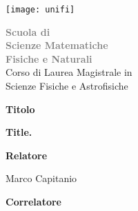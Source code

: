 \newenvironment{helv}{\fontfamily{qhv}\selectfont}{\par}

\begin{titlepage}
\begin{helv}
    \begin{center}
        \begin{minipage}{0.52\textwidth}
            \texttt{[image: unifi]}
        \end{minipage}
        \hfill
        \begin{minipage}{0.4\textwidth}
        \begin{flushright}
        
        \fontsize{14}{16}\selectfont
        \textbf{\textcolor{gray}{
            Scuola di\\
            Scienze Matematiche\\
            Fisiche e Naturali\\
        }}
        \vspace{12pt}
        \fontsize{12}{14}\selectfont
            Corso di Laurea Magistrale in\\
            Scienze Fisiche e Astrofisiche\\
        
        \end{flushright}
        \end{minipage}
        \vfill
    \end{center}

        \hspace*{22mm}
        \begin{minipage}{0.8\textwidth}
        \begin{flushleft}
        \fontsize{36}{42}\selectfont
        \textbf{Titolo}
        \vspace{36pt}
        
        \textbf{Title.}
            
        
        \vspace{3cm}
        {
            \fontsize{14}{0}\selectfont
            \textbf{Relatore}
            
            \vspace{5pt}
            \fontsize{16}{0}\selectfont
            Marco Capitanio
            
            \vspace{15pt}
            \fontsize{14}{0}\selectfont
            \textbf{Correlatore}
            
}
\end{flushleft}
\end{minipage}
\end{helv}
\end{titlepage}
